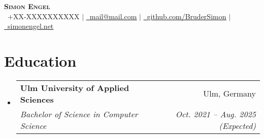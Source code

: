 \documentclass[letterpaper,12pt]{article}
\makeatletter
\newcommand{\resumeSubheading}[4]{
  \vspace{-2pt}\item
  \begin{tabular*}{0.97\textwidth}[t]{l@{\extracolsep{\fill}}r}
    \textbf{#1} & #2 \\
    \textit{\small#3} & \textit{\small #4} \\
  \end{tabular*}\vspace{-7pt}
}
\newcommand{\resumeSubHeadingListStart}{\begin{itemize}[leftmargin=0.15in, label={}]}
\newcommand{\resumeSubHeadingListEnd}{\end{itemize}}
\makeatother
\begin{document}
    

\begin{center}
    \textbf{\Huge \scshape Simon Engel} \\ \vspace{1pt}
    \small \raisebox{-0.1\height}\faPhone\ +XX-XXXXXXXXXX $|$
    \href{mailto:mail@mail.com}{\raisebox{-0.1\height}\faEnvelope\ \underline{mail@mail.com}} $|$ 
    \href{https://github.com/BruderSimon}{\raisebox{-0.2\height}\faGithub\ \underline{github.com/BruderSimon}} $|$
    \href{https://simonengel.net}{\raisebox{-0.2\height}\faGlobe\ \underline{simonengel.net}}
\end{center}


\section{Education}
  \resumeSubHeadingListStart
    \resumeSubheading
      {Ulm University of Applied Sciences}{Ulm, Germany}
      {Bachelor of Science in Computer Science}{Oct. 2021 -- Aug. 2025 (Expected)}
  \resumeSubHeadingListEnd
\end{document}

